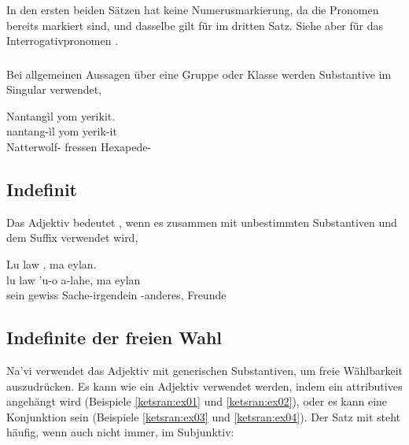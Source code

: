 \noindent In den ersten beiden Sätzen hat  keine Numerusmarkierung, da die Pronomen bereits markiert sind, und dasselbe gilt für  im dritten Satz. Siehe aber  für das Interrogativpronomen .

\subsubsection{} Bei allgemeinen Aussagen über eine Gruppe oder Klasse werden Substantive im Singular verwendet,  

\begin{interlin}
	\glll Nantangìl yom yerikit. \\
	nantang-ìl yom yerik-it \\
	Natterwolf- fressen Hexapede- \\
	 \Ipawl{}
\end{interlin}


\subsection{Indefinit} Das Adjektiv   bedeutet , wenn es zusammen mit unbestimmten Substantiven und dem Suffix  verwendet wird,

\begin{interlin}
	\glll Lu law  , ma eylan. \\
	lu law 'u-o a-lahe, ma eylan \\
	sein gewiss Sache-irgendein -anderes,  Freunde \\
	 \Ipawl{}
\end{interlin}

\subsection{Indefinite der freien Wahl} Na'vi verwendet das Adjektiv   mit generischen Substantiven, um freie Wählbarkeit auszudrücken. Es kann wie ein Adjektiv verwendet werden, indem ein attributives  angehängt wird (Beispiele \ref{ketsran:ex01} und \ref{ketsran:ex02}), oder es kann eine Konjunktion sein (Beispiele \ref{ketsran:ex03} und \ref{ketsran:ex04}). Der Satz mit  steht häufig, wenn auch nicht immer, im Subjunktiv:


